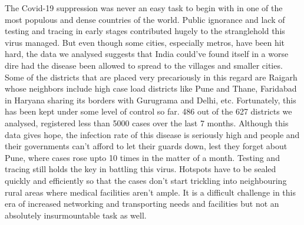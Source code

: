 \documentclass[letterpaper,12pt]{article}
\begin{document}
The Covid-19 suppression was never an easy task to begin with in one of the most populous and dense countries of the world. Public ignorance and lack of testing and tracing in early stages contributed hugely to the stranglehold this virus managed. But even though some cities, especially metros, have been hit hard, the data we analysed suggests that India could've found itself in a worse dire had the disease been allowed to spread to the villages and smaller cities. Some of the districts that are placed very precariously in this regard are Raigarh whose neighbors include high case load districts like Pune and Thane, Faridabad in Haryana sharing its borders with Gurugrama and Delhi, etc. Fortunately, this has been kept under some level of control so far. 486 out of the 627 districts we analysed, registered less than 5000 cases over the last 7 months. Although this data gives hope, the infection rate of this disease is seriously high and people and their governments can't afford to let their guards down, lest they forget about Pune, where cases rose upto 10 times in the matter of a month. Testing and tracing still holds the key in battling this virus. Hotspots have to be sealed quickly and efficiently so that the cases don't start trickling into neighbouring rural areas where medical facilities aren't ample. It is a difficult challenge in this era of increased networking and transporting needs and facilities but not an absolutely insurmountable task as well. 
\end{document}
